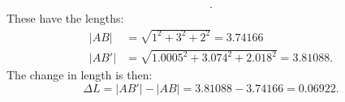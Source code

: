 \begin{derivation}
\begin{align*}
  .\end{align*}
  These have the lengths:
  \begin{align*}
    \left| AB \right| &= \sqrt{1^2 + 3^2 + 2^2}  = 3.74166\\
    \left| AB' \right| &=  \sqrt{\num{1,0005}^2  + \num{3,074}^2  + \num{2,018}^2 }  = 3.81088
  .\end{align*}
  The change in length is then:
  \begin{equation*}
    \Delta L = \left| AB' \right|- \left| AB \right| = \num{3,81088} - \num{3,74166}  = \num{0.06922}
  .\end{equation*}
\end{derivation}

